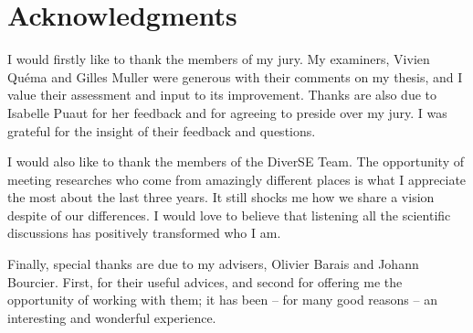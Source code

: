 \thispagestyle{empty}\addtocounter{page}{-1}
\chapter*{Acknowledgments}
\thispagestyle{empty}\addtocounter{page}{-1}

I would firstly like to thank the members of my jury.
My examiners, Vivien Qu\'ema and Gilles Muller were generous with their 
comments on my thesis, and I value their assessment and input to its improvement.
Thanks are also due to Isabelle Puaut for her feedback and for agreeing
to preside over my jury.
I was grateful for the insight of their feedback and questions.

I would also like to thank the members of the DiverSE Team.
The opportunity of meeting researches who come from amazingly different places is
what I appreciate the most about the last three years.
It still shocks me how we share a vision despite of our differences.
I would love to believe that listening all the scientific discussions has positively transformed
who I am. 

Finally, special thanks are due to my advisers, Olivier Barais and Johann Bourcier.
First, for their useful advices, and second for offering me the opportunity of working
with them; it has been -- for many good reasons -- an interesting and wonderful experience.    


